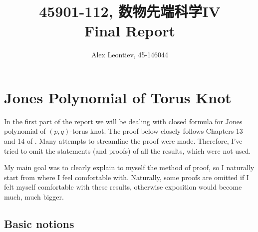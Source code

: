 \documentclass[10pt]{article} %
\title{45901-112, 数物先端科学IV\\Final Report}
\author{Alex Leontiev, 45-146044}
\theoremstyle{remark}
\begin{document}
\begin{CJK}{UTF8}{bsmi}
\maketitle
\end{CJK}
\tableofcontents
\section{Jones Polynomial of Torus Knot}
In the first part of the report we will be dealing with closed formula for Jones polynomial of $(p,q)$-torus knot. The proof below
closely follows Chapters 13 and 14 of \cite{Lickorish}. Many attempts to streamline the proof were made. Therefore, I've tried to omit the statements
(and proofs) of all the results, which were not used.

My main goal was to 
clearly explain to myself the method of proof, so I naturally start from where I feel comfortable with. Naturally, some proofs are omitted
if I felt myself comfortable with these results, otherwise exposition would become much, much bigger.
\subsection{Basic notions}
\end{document}

